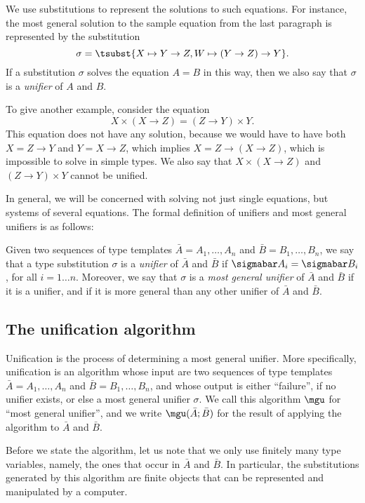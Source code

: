 \documentclass[12pt]{article}
\begin{document}
We use substitutions to represent the solutions to such equations. For
instance, the most general solution to the sample equation from the
last paragraph is represented by the substitution
\[ \sigma=\tsubst{X\mapsto Y\to Z, W\mapsto (Y\to Z)\to Y}.
\]
If a substitution $\sigma$ solves the equation $A=B$ in this way, then
we also say that $\sigma$ is a {\em unifier} of $A$ and $B$.

To give another example, consider the equation
\[ X\times(X\to Z) = (Z\to Y)\times Y.
\]
This equation does not have any solution, because we would have to
have both $X=Z\to Y$ and $Y=X\to Z$, which implies $X=Z\to(X\to Z)$,
which is impossible to solve in simple types. We also say that
$X\times(X\to Z)$ and $(Z\to Y)\times Y$ cannot be unified. 

In general, we will be concerned with solving not just single
equations, but systems of several equations. The formal definition of
unifiers and most general unifiers is as follows:

\begin{definition}
  Given two sequences of type templates $\bar{A}=A_1,\ldots,A_n$ and
  $\bar{B}=B_1,\ldots,B_n$, we say that a type substitution $\sigma$
  is a {\em unifier} of $\bar{A}$ and $\bar{B}$ if $\sigmabar
  A_i=\sigmabar B_i$, for all $i=1\ldots n$. Moreover, we say that
  $\sigma$ is a {\em most general unifier} of $\bar{A}$ and $\bar{B}$
  if it is a unifier, and if it is more general than any other
  unifier of $\bar{A}$ and $\bar{B}$.
\end{definition}

\subsection{The unification algorithm}

Unification is the process of determining a most general unifier. More
specifically, unification is an algorithm whose input are two
sequences of type templates $\bar{A}=A_1,\ldots,A_n$ and
$\bar{B}=B_1,\ldots,B_n$, and whose output is either ``failure'', if
no unifier exists, or else a most general unifier $\sigma$. We call
this algorithm $\mgu$ for ``most general unifier'', and we write
$\mgu(\bar{A};\bar{B})$ for the result of applying the algorithm to
$\bar{A}$ and $\bar{B}$. 

Before we state the algorithm, let us note that we only use finitely
many type variables, namely, the ones that occur in $\bar{A}$ and
$\bar{B}$. In particular, the substitutions generated by this
algorithm are finite objects that can be represented and manipulated
by a computer. 
\end{document}
